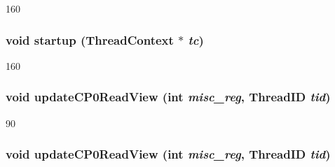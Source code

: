 \begin{DoxyCode}
160 {}
\end{DoxyCode}
\hypertarget{classMipsISA_1_1ISA_a769e733729615c529fdb54f538f11dba}{
\subsubsection[{startup}]{\setlength{\rightskip}{0pt plus 5cm}void startup ({\bf ThreadContext} $\ast$ {\em tc})}}
\label{classMipsISA_1_1ISA_a769e733729615c529fdb54f538f11dba}



\begin{DoxyCode}
160 {}
\end{DoxyCode}
\hypertarget{classMipsISA_1_1ISA_ab5936dc40fc4dbeac3066d5d7cffeb11}{
\subsubsection[{updateCP0ReadView}]{\setlength{\rightskip}{0pt plus 5cm}void updateCP0ReadView (int {\em misc\_\-reg}, \/  {\bf ThreadID} {\em tid})}}
\label{classMipsISA_1_1ISA_ab5936dc40fc4dbeac3066d5d7cffeb11}



\begin{DoxyCode}
90 { }
\end{DoxyCode}
\hypertarget{classMipsISA_1_1ISA_ab5936dc40fc4dbeac3066d5d7cffeb11}{
\subsubsection[{updateCP0ReadView}]{\setlength{\rightskip}{0pt plus 5cm}void updateCP0ReadView (int {\em misc\_\-reg}, \/  {\bf ThreadID} {\em tid})}}
\label{classMipsISA_1_1ISA_ab5936dc40fc4dbeac3066d5d7cffeb11}



